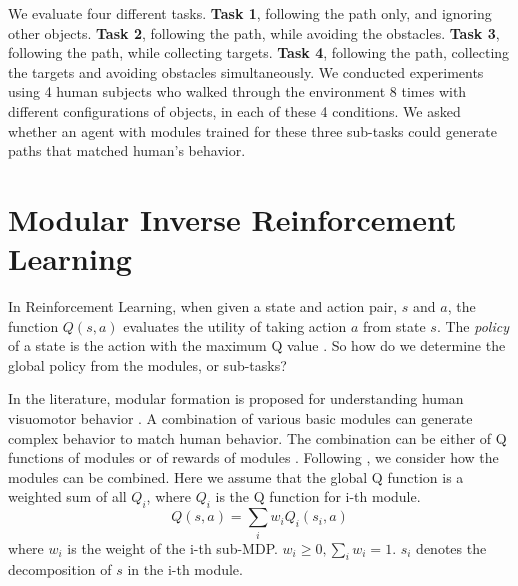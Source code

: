 We evaluate four different tasks. {\bf Task 1}, following the path only, and
ignoring other objects. {\bf Task 2}, following the path, while avoiding the
obstacles.  {\bf Task 3}, following the path, while collecting targets. {\bf
Task 4}, following the path, collecting the targets and avoiding obstacles
simultaneously.  We conducted experiments using 4 human subjects who walked
through the environment 8 times with different configurations of objects, in
each of these 4 conditions.  We asked whether an agent with modules trained for
these three sub-tasks could generate paths that matched human's behavior.

\section{Modular Inverse Reinforcement Learning}
\label{sec:rl}

In Reinforcement Learning, when given a state and action pair, $s$ and $a$, the
function $Q(s, a)$ evaluates the utility of taking action $a$ from state $s$.
The {\em policy} of a state is the action with the maximum Q value \cite{rl}. So
how do we determine the global policy from the modules, or sub-tasks?


In the literature, modular formation is proposed for understanding human
visuomotor behavior \cite{sprague2007modeling}. A combination of various basic
modules can generate complex behavior to match human behavior.  The combination
can be either of Q functions of modules \cite{rothkopf2013modular} or of rewards
of modules \cite{Rothkopf12Infer}.
Following \cite{sprague2007modeling, rothkopf2013modular}, we consider how the
modules can be combined. Here we assume that the global Q function is a weighted
sum of all $Q_i$, where $Q_i$ is the Q function for i-th module.
$$Q(s, a) = \sum_i w_i Q_i (s_i, a)$$
where $w_i$ is the weight of the i-th sub-MDP. $w_i \geq 0, \sum_i w_i = 1$.
$s_i$ denotes the decomposition of $s$ in the i-th module.

